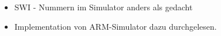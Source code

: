 \begin{itemize}
	\item SWI - Nummern im Simulator anders als gedacht
	\item Implementation von ARM-Simulator dazu durchgelesen.
\end{itemize}